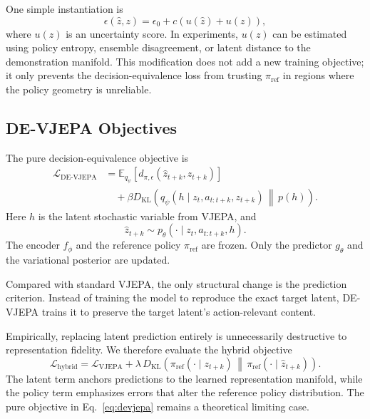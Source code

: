 \documentclass[10pt,twocolumn]{article}
\theoremstyle{tightstyle}
\begin{document}
One simple instantiation is
\begin{equation}
  \epsilon(\hat z,z)
  =
  \epsilon_0
  +
  c \left(
  u(\hat z) + u(z)
  \right),
  \label{eq:epsilon}
\end{equation}
where $u(z)$ is an uncertainty score.
In experiments, $u(z)$ can be estimated using policy entropy, ensemble disagreement,
or latent distance to the demonstration manifold.
This modification does not add a new training objective; it only prevents the
decision-equivalence loss from trusting $\pi_{\mathrm{ref}}$ in regions where the
policy geometry is unreliable.

\subsection{DE-VJEPA Objectives}

The pure decision-equivalence objective is
\begin{equation}
\begin{aligned}
  \mathcal{L}_{\mathrm{DE\text{-}VJEPA}}
  &=
  \mathbb{E}_{q_\psi}
  \left[
  d_{\pi,\epsilon}(\hat z_{t+k}, z_{t+k})
  \right]  \\
  &\quad
  + \beta
  D_{\mathrm{KL}}\!\left(
  q_\psi(h \mid z_t,a_{t:t+k},z_{t+k})
  \,\middle\|\,
  p(h)
  \right).
\end{aligned}
\label{eq:devjepa}
\end{equation}
Here $h$ is the latent stochastic variable from VJEPA, and
\[
  \hat z_{t+k}
  \sim
  p_\theta(\cdot \mid z_t,a_{t:t+k},h).
\]
The encoder $f_\phi$ and the reference policy $\pi_{\mathrm{ref}}$ are frozen.
Only the predictor $g_\theta$ and the variational posterior are updated.

Compared with standard VJEPA, the only structural change is the prediction
criterion.
Instead of training the model to reproduce the exact target latent, DE-VJEPA trains
it to preserve the target latent's action-relevant content.

Empirically, replacing latent prediction entirely is unnecessarily destructive to
representation fidelity. We therefore evaluate the hybrid objective
\begin{equation}
  \mathcal{L}_{\mathrm{hybrid}}
  =
  \mathcal{L}_{\mathrm{VJEPA}}
  +
  \lambda\,
  D_{\mathrm{KL}}\!\left(
  \pi_{\mathrm{ref}}(\cdot\mid z_{t+k})
  \,\middle\|\,
  \pi_{\mathrm{ref}}(\cdot\mid \hat z_{t+k})
  \right).
  \label{eq:hybrid}
\end{equation}
The latent term anchors predictions to the learned representation manifold, while
the policy term emphasizes errors that alter the reference policy distribution.
The pure objective in Eq.~\eqref{eq:devjepa} remains a theoretical limiting case.
\end{document}
